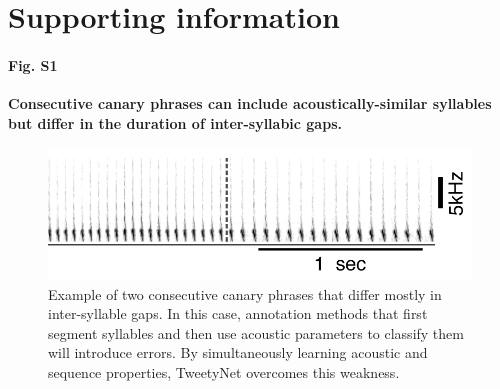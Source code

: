 \documentclass[10pt,letterpaper]{article}
\newcommand{\beginsupplement}{%
        \setcounter{table}{0}
        \renewcommand{\thetable}{S\arabic{table}}%
        \setcounter{figure}{0}
        \renewcommand{\thefigure}{S\arabic{figure}}%
     }
\begin{document}
\section*{Supporting information}
\beginsupplement
\paragraph*{Fig. S1}
\label{S1_Fig}
{\bf Consecutive canary phrases can include acoustically-similar syllables but differ in the duration of inter-syllabic gaps.}
\begin{figure}[!h]
\includegraphics[scale=1.0]{Figures/Supplementaries/Supp_Figure1_1.png}
\caption{Example of two consecutive canary phrases that differ mostly in inter-syllable gaps. In this case, annotation methods that first segment syllables and then use acoustic parameters to classify them will introduce errors. By simultaneously learning acoustic and sequence properties, TweetyNet overcomes this weakness.}
\label{supp_fig_1}
\end{figure}
\end{document}

